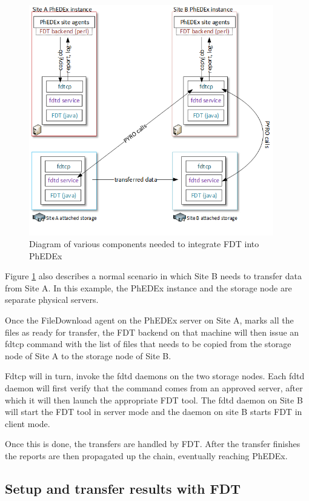 \begin{figure}[h]
  \centering
  \includegraphics[width=0.95\textwidth]{Figures/PhEDEx-and-FDT-diagram.png}
  \caption{Diagram of various components needed to integrate FDT into PhEDEx}
  \label{fig:PhEDEx-FDT-arch}
\end{figure} 

Figure \ref{fig:PhEDEx-FDT-arch} also describes a normal scenario in which Site B
needs to transfer data from Site A. In this example, the PhEDEx instance and the
storage node are separate physical servers. 

Once the FileDownload agent on the PhEDEx server on Site A, marks all the files as
ready for transfer, the FDT backend on that machine will then issue an fdtcp 
command with the list of files that needs to be copied from the storage node of
Site A to the storage node of Site B.

Fdtcp will in turn, invoke the fdtd daemons on the two storage nodes. Each fdtd
daemon will first verify that the command comes from an approved server, after
which it will then launch the appropriate FDT tool. The fdtd daemon on Site B 
will start the FDT tool in server mode and the daemon on site B starts FDT in 
client mode.

Once this is done, the transfers are handled by FDT. After the transfer finishes
the reports are then propagated up the chain, eventually reaching PhEDEx.

\subsection{Setup and transfer results with FDT}

